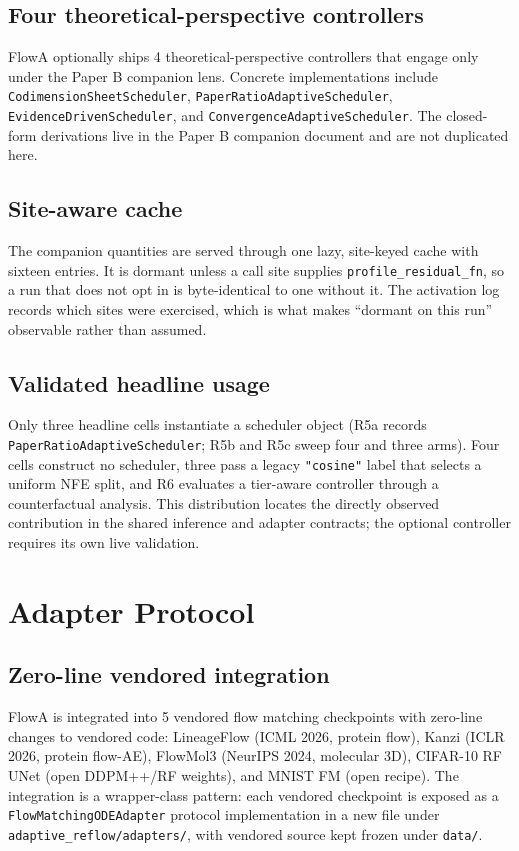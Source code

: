 \documentclass[journal,twocolumn,final]{IEEEtran}
\begin{document}
\subsection{Four theoretical-perspective controllers}

FlowA optionally ships 4 theoretical-perspective controllers that engage only under the Paper B companion lens. Concrete implementations include \texttt{CodimensionSheetScheduler}, \texttt{PaperRatioAdaptiveScheduler}, \texttt{EvidenceDrivenScheduler}, and \texttt{ConvergenceAdaptiveScheduler}. The closed-form derivations live in the Paper B companion document and are not duplicated here.

\subsection{Site-aware cache}
The companion quantities are served through one lazy, site-keyed cache with sixteen entries. It is dormant unless a call site supplies \texttt{profile\_residual\_fn}, so a run that does not opt in is byte-identical to one without it. The activation log records which sites were exercised, which is what makes ``dormant on this run'' observable rather than assumed.

\subsection{Validated headline usage}
Only three headline cells instantiate a scheduler object (R5a records \texttt{PaperRatioAdaptiveScheduler}; R5b and R5c sweep four and three arms). Four cells construct no scheduler, three pass a legacy \texttt{"cosine"} label that selects a uniform NFE split, and R6 evaluates a tier-aware controller through a counterfactual analysis. This distribution locates the directly observed contribution in the shared inference and adapter contracts; the optional controller requires its own live validation.

\section{Adapter Protocol}
\label{sec:adapter}

\subsection{Zero-line vendored integration}

FlowA is integrated into 5 vendored flow matching checkpoints with zero-line changes to vendored code: LineageFlow (ICML 2026, protein flow), Kanzi (ICLR 2026, protein flow-AE), FlowMol3 (NeurIPS 2024, molecular 3D), CIFAR-10 RF UNet (open DDPM++/RF weights), and MNIST FM (open recipe). The integration is a wrapper-class pattern: each vendored checkpoint is exposed as a \texttt{FlowMatchingODEAdapter} protocol implementation in a new file under \texttt{adaptive\_reflow/adapters/}, with vendored source kept frozen under \texttt{data/}.
\end{document}
